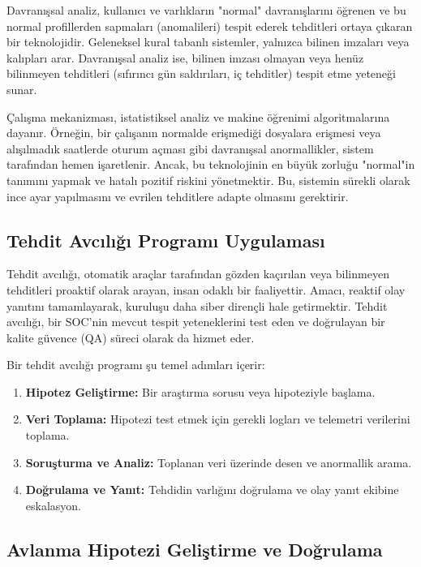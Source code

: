 Davranışsal analiz, kullanıcı ve varlıkların "normal" davranışlarını öğrenen ve bu normal profillerden sapmaları (anomalileri) tespit ederek tehditleri ortaya çıkaran bir teknolojidir. Geleneksel kural tabanlı sistemler, yalnızca bilinen imzaları veya kalıpları arar. Davranışsal analiz ise, bilinen imzası olmayan veya henüz bilinmeyen tehditleri (sıfırıncı gün saldırıları, iç tehditler) tespit etme yeteneği sunar.

Çalışma mekanizması, istatistiksel analiz ve makine öğrenimi algoritmalarına dayanır. Örneğin, bir çalışanın normalde erişmediği dosyalara erişmesi veya alışılmadık saatlerde oturum açması gibi davranışsal anormallikler, sistem tarafından hemen işaretlenir. Ancak, bu teknolojinin en büyük zorluğu "normal"in tanımını yapmak ve hatalı pozitif riskini yönetmektir. Bu, sistemin sürekli olarak ince ayar yapılmasını ve evrilen tehditlere adapte olmasını gerektirir.

\subsection{Tehdit Avcılığı Programı Uygulaması}

Tehdit avcılığı, otomatik araçlar tarafından gözden kaçırılan veya bilinmeyen tehditleri proaktif olarak arayan, insan odaklı bir faaliyettir. Amacı, reaktif olay yanıtını tamamlayarak, kuruluşu daha siber dirençli hale getirmektir. Tehdit avcılığı, bir SOC'nin mevcut tespit yeteneklerini test eden ve doğrulayan bir kalite güvence (QA) süreci olarak da hizmet eder.

Bir tehdit avcılığı programı şu temel adımları içerir:
\begin{enumerate}
    \item \textbf{Hipotez Geliştirme:} Bir araştırma sorusu veya hipoteziyle başlama.
    \item \textbf{Veri Toplama:} Hipotezi test etmek için gerekli logları ve telemetri verilerini toplama.
    \item \textbf{Soruşturma ve Analiz:} Toplanan veri üzerinde desen ve anormallik arama.
    \item \textbf{Doğrulama ve Yanıt:} Tehdidin varlığını doğrulama ve olay yanıt ekibine eskalasyon.
\end{enumerate}

\subsection{Avlanma Hipotezi Geliştirme ve Doğrulama}

